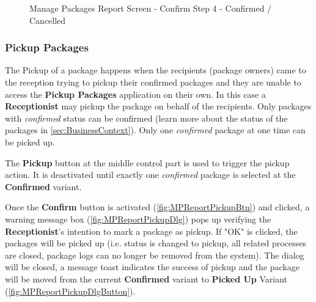\begin{figure}[H]
	\centering
	\hspace{5pt}
    \caption{Manage Packages Report Screen - Confirm Step 4 - Confirmed / Cancelled}
	\label{fig:MPReportConfirmDlgButton}
\end{figure}

\subsubsection{Pickup Packages}
\label{subsubsec:MPpickup}

The Pickup of a package happens when the recipients (package owners) came to the reception trying to pickup their confirmed packages and they are unable to access the \textbf{Pickup Packages} application on their own. In this case a \textbf{Receptionist} may pickup the package on behalf of the recipients. Only packages with \textit{confirmed} status can be confirmed (learn more about the status of the packages in \autoref{sec:BusinessContext}). Only one \textit{confirmed} package at one time can be picked up.

The \textbf{Pickup} button at the middle control part is used to trigger the pickup action. It is deactivated until exactly one \textit{confirmed} package is selected at the \textbf{Confirmed} variant.

Once the \textbf{Confirm} button is activated (\autoref{fig:MPReportPickupBtn}) and clicked, a warning message box (\autoref{fig:MPReportPickupDlg}) pops up verifying the \textbf{Receptionist}'s intention to mark a package as pickup. If "OK" is clicked, the packages will be picked up (i.e. status is changed to pickup, all related processes are closed, package logs can no longer be removed from the system). The dialog will be closed, a message toast indicates the success of pickup and the package will be moved from the current \textbf{Confirmed} variant to \textbf{Picked Up} Variant (\autoref{fig:MPReportPickupDlgButton}). 

